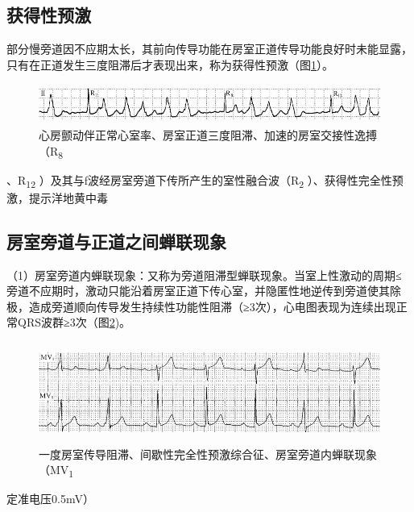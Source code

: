 \protect\hypertarget{text00036.htmlux5cux23subid428}{}{}

\subsection{获得性预激}

部分慢旁道因不应期太长，其前向传导功能在房室正道传导功能良好时未能显露，只有在正道发生三度阻滞后才表现出来，称为获得性预激（图\ref{fig29-9}）。

\begin{figure}[!htbp]
 \centering
 \includegraphics[width=5.61458in,height=0.51042in]{./images/Image00493.jpg}
 \captionsetup{justification=centering}
 \caption{心房颤动伴正常心室率、房室正道三度阻滞、加速的房室交接性逸搏（R\textsubscript{8}}
 \label{fig29-9}
  \end{figure} 
、R\textsubscript{12}
）及其与f波经房室旁道下传所产生的室性融合波（R\textsubscript{2}
）、获得性完全性预激，提示洋地黄中毒

\protect\hypertarget{text00036.htmlux5cux23subid429}{}{}

\subsection{房室旁道与正道之间蝉联现象}

（1）房室旁道内蝉联现象：又称为旁道阻滞型蝉联现象。当室上性激动的周期≤旁道不应期时，激动只能沿着房室正道下传心室，并隐匿性地逆传到旁道使其除极，造成旁道顺向传导发生持续性功能性阻滞（≥3次），心电图表现为连续出现正常QRS波群≥3次（图\ref{fig29-10})。

\begin{figure}[!htbp]
 \centering
 \includegraphics[width=5.58333in,height=1.30208in]{./images/Image00494.jpg}
 \captionsetup{justification=centering}
 \caption{一度房室传导阻滞、间歇性完全性预激综合征、房室旁道内蝉联现象（MV\textsubscript{1}}
 \label{fig29-10}
  \end{figure} 
定准电压0.5mV）

